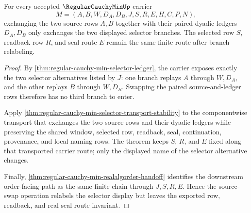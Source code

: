 \begin{theorem}
\label{thm:regular-cauchy-min-source-swap-invariance}
For every accepted $\RegularCauchyMinUp$ carrier
$$
M=(A,B,W,D_A,D_B,J,S,R,E,H,C,P,N),
$$
exchanging the two source rows $A,B$ together with their paired dyadic ledgers $D_A,D_B$ only exchanges the two displayed selector branches. The selected row $S$, readback row $R$, and seal route $E$ remain the same finite route after branch relabeling.
\end{theorem}
\begin{proof}
By \autoref{thm:regular-cauchy-min-selector-ledger}, the carrier exposes exactly the two selector alternatives listed by $J$: one branch replays $A$ through $W,D_A$, and the other replays $B$ through $W,D_B$. Swapping the paired source-and-ledger rows therefore has no third branch to enter.

Apply \autoref{thm:regular-cauchy-min-selector-transport-stability} to the componentwise transport that exchanges the two source rows and their dyadic ledgers while preserving the shared window, selected row, readback, seal, continuation, provenance, and local naming rows. The theorem keeps $S$, $R$, and $E$ fixed along that transported carrier route; only the displayed name of the selector alternative changes.

Finally, \autoref{thm:regular-cauchy-min-realalgorder-handoff} identifies the downstream order-facing path as the same finite chain through $J,S,R,E$. Hence the source-swap operation relabels the selector display but leaves the exported row, readback, and real seal route invariant.
\end{proof}

